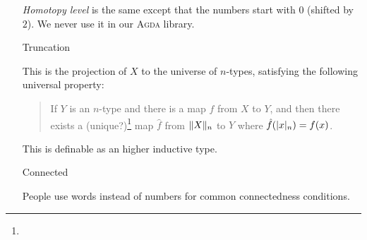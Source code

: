 \documentclass{article}
\begin{document}
\begin{itemize}
    \emph{Homotopy level} is the same except that the numbers start with $0$ (shifted by $2$).
    We never use it in our \textsc{Agda} library.

  \item[Truncation]



    This is the projection of $X$ to the universe of $n$-types,
    satisfying the following universal property:

    \begin{quote}
      If $Y$ is an $n$-type and there is a map $f$ from $X$ to $Y$,
      and then there exists a (unique?)\footnote{} map $\hat f$
      from $\trunc{n}{X}$ to $Y$ where $\hat f(\proj{n}{x}) = f(x)$.
    \end{quote}

    This is definable as an higher inductive type.

  \item[Connected]




    People use words instead of numbers for common connectedness conditions.
\end{itemize}
\end{document}
